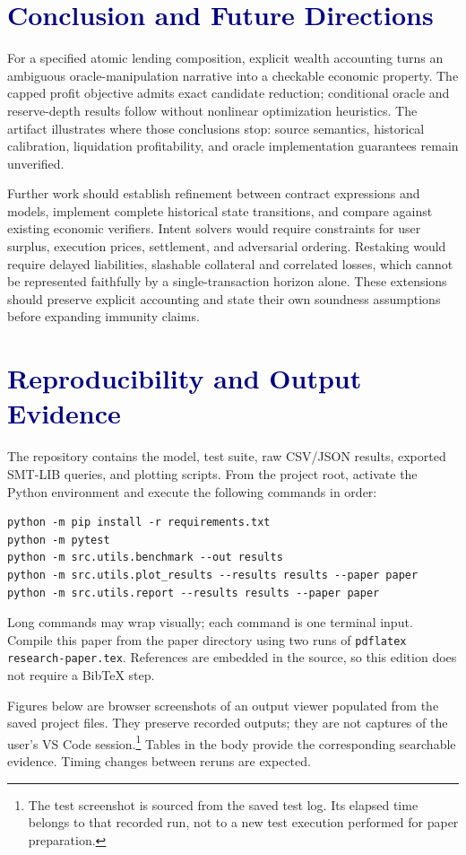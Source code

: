 \documentclass[conference]{IEEEtran}
\begin{document}
\section{\textcolor{Navy}{Conclusion and Future Directions}}
For a specified atomic lending composition, explicit wealth accounting turns
an ambiguous oracle-manipulation narrative into a checkable economic property.
The capped profit objective admits exact candidate reduction; conditional
oracle and reserve-depth results follow without nonlinear optimization heuristics.
The artifact illustrates where those conclusions stop: source semantics,
historical calibration, liquidation profitability, and oracle implementation
guarantees remain unverified.

Further work should establish refinement between contract expressions and
models, implement complete historical state transitions, and compare against
existing economic verifiers. Intent solvers would require constraints for
user surplus, execution prices, settlement, and adversarial ordering. Restaking
would require delayed liabilities, slashable collateral and correlated losses,
which cannot be represented faithfully by a single-transaction horizon alone.
These extensions should preserve explicit accounting and state their own
soundness assumptions before expanding immunity claims.


\clearpage
\onecolumn

\clearpage
\appendices
\section{\textcolor{Navy}{Reproducibility and Output Evidence}}
The repository contains the model, test suite, raw CSV/JSON results, exported
SMT-LIB queries, and plotting scripts. From the project root, activate the
Python environment and execute the following commands in order:
\begin{verbatim}
python -m pip install -r requirements.txt
python -m pytest
python -m src.utils.benchmark --out results
python -m src.utils.plot_results --results results --paper paper
python -m src.utils.report --results results --paper paper
\end{verbatim}
Long commands may wrap visually; each command is one terminal input.
Compile this paper from the paper directory using two runs of
\texttt{pdflatex research-paper.tex}. References are embedded in the source,
so this edition does not require a BibTeX step.

Figures below are browser screenshots of an output viewer populated from
the saved project files. They preserve recorded outputs; they are not captures
of the user's VS Code session.\footnote{The test screenshot is sourced from
the saved test log. Its elapsed time belongs to that recorded run, not to a
new test execution performed for paper preparation.} Tables in the body provide
the corresponding searchable evidence. Timing changes between reruns are expected.
\end{document}
